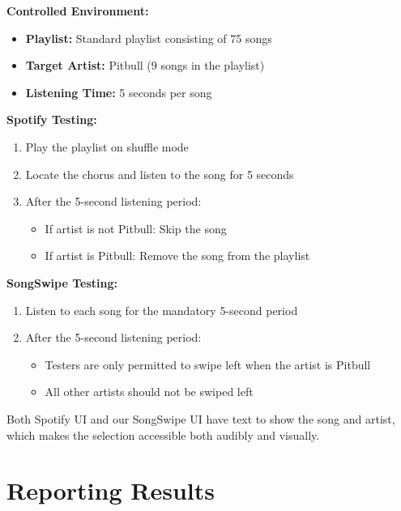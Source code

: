 \documentclass{article}
\begin{document}
   \textbf{Controlled Environment:}
    
    \begin{itemize}
    \item \textbf{Playlist:} Standard playlist consisting of 75 songs
    \item \textbf{Target Artist:} Pitbull (9 songs in the playlist)
    \item \textbf{Listening Time:} 5 seconds per song
    \end{itemize}
    
    \textbf{Spotify Testing:} 
    
    \begin{enumerate}
        \item Play the playlist on shuffle mode
        \item Locate the chorus and listen to the song for 5 seconds
        \item After the 5-second listening period:
            \begin{itemize}
                \item If artist is not Pitbull: Skip the song
                \item If artist is Pitbull: Remove the song from the playlist
            \end{itemize}
    \end{enumerate}

    \textbf{SongSwipe Testing:}
    
    \begin{enumerate}
        \item Listen to each song for the mandatory 5-second period
        \item After the 5-second listening period:
            \begin{itemize}
                \item Testers are only permitted to swipe left when the artist is Pitbull
                \item All other artists should not be swiped left
            \end{itemize}
    \end{enumerate}

    Both Spotify UI and our SongSwipe UI have text to show the song and artist, which makes the selection accessible both audibly and visually.
    
\section{Reporting Results}
\end{document}
